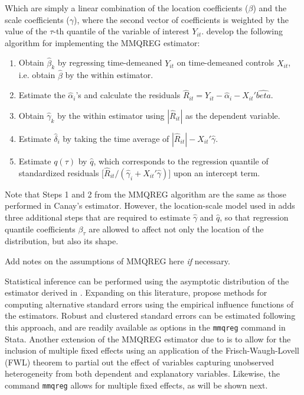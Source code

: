 \documentclass{article}
\begin{document}
Which are simply a linear combination of the location coefficients ($\beta$) and the scale coefficients ($\gamma$), where the second vector of coefficients is weighted by the value of the $\tau$-th quantile of the variable of interest $Y_{it}$. \cite{mss2019} develop the following algorithm for implementing the MMQREG estimator:

\begin{enumerate}
    \item Obtain $\hat{\beta}_k$ by regressing time-demeaned $Y_{it}$ on time-demeaned controls $X_{it}$, i.e. obtain $\hat{\beta}$ by the within estimator.
    \item Estimate the $\hat{\alpha}_i$'s and calculate the residuals $\hat{R}_{it} = Y_{it} - \hat{\alpha}_i - X_{it}' \hat{beta}$.
    \item Obtain $\hat{\gamma}_k$ by the within estimator using $|\hat{R}_{it}|$ as the dependent variable.
    \item Estimate $\hat{\delta}_i$ by taking the time average of $|\hat{R}_{it}| - X_{it}' \hat{\gamma}$.
    \item Estimate $q(\tau)$ by $\hat{q}$, which corresponds to the regression quantile of standardized residuals [$\hat{R}_{it}/(\hat{\gamma}_{i} + X_{it}' \hat{\gamma})]$ upon an intercept term. 
\end{enumerate}

Note that Steps 1 and 2 from the MMQREG algorithm are the same as those performed in Canay's estimator. However, the location-scale model used in \cite{mss2019} adds three additional steps that are required to estimate $\hat{\gamma}$ and $\hat{q}$, so that regression quantile coefficients  $\beta_{\tau}$ are allowed to affect not only the location of the distribution, but also its shape.

Add notes on the assumptions of MMQREG here \textit{if} necessary.

Statistical inference can be performed using the asymptotic distribution of the estimator derived in \cite{mss2019}. Expanding on this literature, \cite{riosavila2024} propose methods for computing alternative standard errors using the empirical influence functions of the estimators. Robust and clustered standard errors can be estimated following this approach, and are readily available as options in the \texttt{mmqreg} command in Stata. Another extension of the MMQREG estimator due to \cite{riosavila2024} is to allow for the inclusion of multiple fixed effects using an application of the Frisch-Waugh-Lovell (FWL) theorem to partial out the effect of variables capturing unobserved heterogeneity from both dependent and explanatory variables. Likewise, the command \texttt{mmqreg} allows for multiple fixed effects, as will be shown next.
\end{document}
